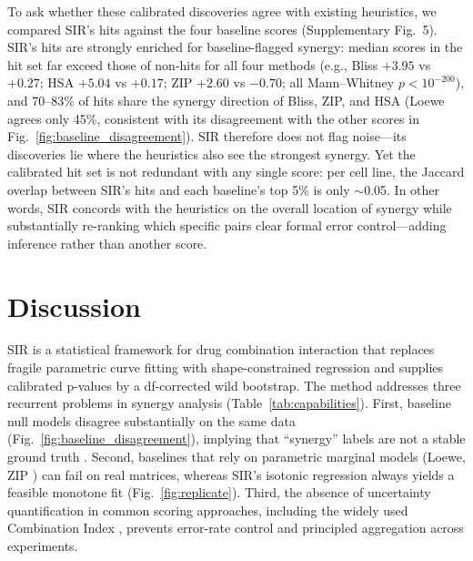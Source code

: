 \documentclass[pdflatex,sn-nature]{sn-jnl}%
\begin{document}
To ask whether these calibrated discoveries agree with existing heuristics, we compared SIR's hits against the four baseline scores (Supplementary Fig.~5).
SIR's hits are strongly enriched for baseline-flagged synergy: median scores in the hit set far exceed those of non-hits for all four methods (e.g., Bliss $+3.95$ vs $+0.27$; HSA $+5.04$ vs $+0.17$; ZIP $+2.60$ vs $-0.70$; all Mann--Whitney $p<10^{-200}$), and 70--83\% of hits share the synergy direction of Bliss, ZIP, and HSA (Loewe agrees only 45\%, consistent with its disagreement with the other scores in Fig.~\ref{fig:baseline_disagreement}).
SIR therefore does not flag noise---its discoveries lie where the heuristics also see the strongest synergy.
Yet the calibrated hit set is not redundant with any single score: per cell line, the Jaccard overlap between SIR's hits and each baseline's top 5\% is only $\sim$0.05.
In other words, SIR concords with the heuristics on the overall location of synergy while substantially re-ranking which specific pairs clear formal error control---adding inference rather than another score.

\section{Discussion}

SIR is a statistical framework for drug combination interaction that replaces fragile parametric curve fitting with shape-constrained regression and supplies calibrated p-values by a df-corrected wild bootstrap.
The method addresses three recurrent problems in synergy analysis (Table~\ref{tab:capabilities}).
First, baseline null models disagree substantially on the same data (Fig.~\ref{fig:baseline_disagreement}), implying that ``synergy'' labels are not a stable ground truth \cite{Foucquier2015,Berenbaum1989}.
Second, baselines that rely on parametric marginal models (Loewe, ZIP \cite{Yadav2015}) can fail on real matrices, whereas SIR's isotonic regression \cite{Robertson1988} always yields a feasible monotone fit (Fig.~\ref{fig:replicate}).
Third, the absence of uncertainty quantification in common scoring approaches, including the widely used Combination Index \cite{Chou1984,Chou2010}, prevents error-rate control and principled aggregation across experiments.
\end{document}
